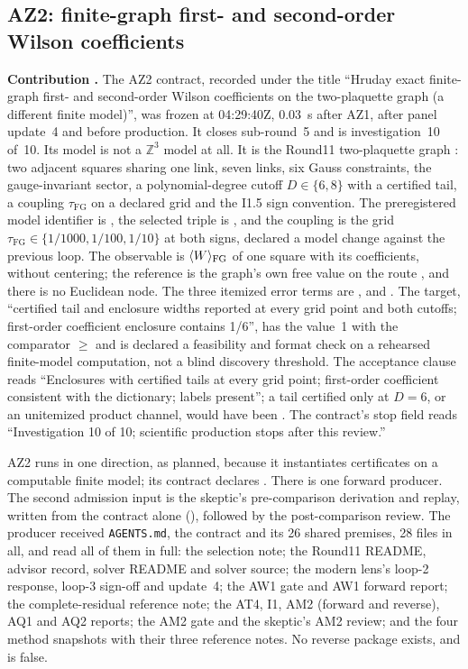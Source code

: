 \subsection{AZ2: finite-graph first- and second-order Wilson coefficients}
\label{sec:az2}
\providecommand{\tfg}{\tau_{\mathrm{FG}}}

\textbf{Contribution .} The AZ2 contract, recorded under
the title ``Hruday exact finite-graph first- and second-order Wilson
coefficients on the two-plaquette graph (a different finite model)'', was
frozen at 04:29:40Z, 0.03~s after AZ1, after panel update~4 and before
production. It closes sub-round~5 and is investigation~10 of~10. Its model is
not a $\mathbb Z^3$ model at all. It is the Round11 two-plaquette graph
\cite{r11}: two adjacent squares sharing one link, seven links, six Gauss
constraints, the gauge-invariant sector, a polynomial-degree cutoff
$D\in\{6,8\}$ with a certified tail, a coupling $\tfg$ on a declared grid and
the I1.5 sign convention. The preregistered model identifier is
, the
selected triple is , and the coupling is the grid
$\tfg\in\{1/1000,1/100,1/10\}$ at both signs, declared a model change against
the previous loop. The observable is $\langle W\rangle_{\rm FG}$ of one square
with its coefficients, without centering; the reference is the graph's own
free value on the route , and there is no Euclidean
node. The three itemized error terms are ,
 and . The target, ``certified
tail and enclosure widths reported at every grid point and both cutoffs;
first-order coefficient enclosure contains 1/6'', has the value~1 with the
comparator $\ge$ and is declared a feasibility and format check on a
rehearsed finite-model computation, not a blind discovery threshold. The
acceptance clause reads ``Enclosures with certified tails at every grid point;
first-order coefficient consistent with the dictionary; labels present''; a
tail certified only at $D=6$, or an unitemized product channel, would have
been . The contract's stop field reads ``Investigation 10 of
10; scientific production stops after this review.''

AZ2 runs in one direction, as planned, because it instantiates certificates
on a computable finite model; its contract declares .
There is one forward producer.
The second admission input is the skeptic's pre-comparison derivation and
replay, written from the contract alone
(), followed by the
post-comparison review. The producer received \texttt{AGENTS.md}, the contract
and its 26 shared premises, 28 files in all, and read all of them in full: the
selection note; the Round11 README, advisor record, solver README and solver
source; the modern lens's loop-2 response, loop-3 sign-off and update~4; the
AW1 gate and AW1 forward report; the complete-residual reference note; the
AT4, I1, AM2 (forward and reverse), AQ1 and AQ2 reports; the AM2 gate and the
skeptic's AM2 review; and the four method snapshots with their three
reference notes. No reverse package exists, and
 is false.


